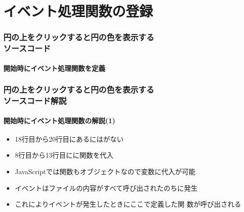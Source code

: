\section{イベント処理関数の登録}
\iffalse
\begin{frame}[containsverbatim]
 \frametitle{円の上をクリックすると円の色を表示する\\ソースコード\REF{144}}
 \framesubtitle{要素にイベント処理関数を定義}
\centering 前のビデオにおけるリスト(比較のために再掲)
 \LISTAll{7}{svg-js-click.svg}
\end{frame}
\fi
\begin{frame}[containsverbatim]
 \frametitle{円の上をクリックすると円の色を表示する\\ソースコード}
  \framesubtitle{開始時にイベント処理関数を定義}
\end{frame}
\begin{frame}[containsverbatim]
 \frametitle{円の上をクリックすると円の色を表示する\\ソースコード解説}
  \framesubtitle{開始時にイベント処理関数の解説(1)}
 \begin{itemize}
  \item 18行目から20行目にあるにはがない
  \item 8行目から13行目にに関数を代入
  \item JavaScriptでは関数もオブジェクトなので変数に代入が可能
  \item {}イベントはファイルの内容がすべて呼び出されたのちに発生
  \item これによりイベントが発生したときにここで定義した関
        数が呼び出される
 \end{itemize}
\end{frame}
